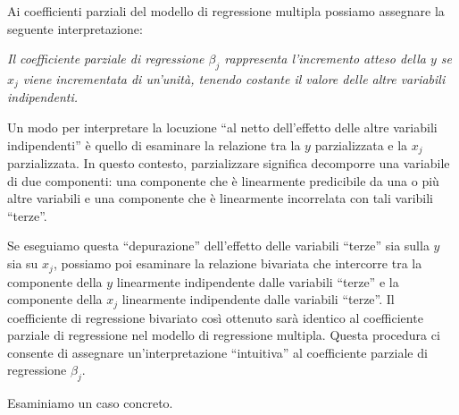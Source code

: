 \documentclass[
  11pt,
]{krantz}
\makeatletter
\newenvironment{Shaded}{\begin{snugshade}}{\end{snugshade}}
\newcommand{\CommentTok}[1]{\textcolor[rgb]{0.37,0.37,0.37}{\textit{#1}}}
\newcommand{\FunctionTok}[1]{\textcolor[rgb]{0,0,0}{#1}}
\newcommand{\NormalTok}[1]{#1}
\newcommand{\OtherTok}[1]{\textcolor[rgb]{0.37,0.37,0.37}{#1}}
\newcommand{\SpecialCharTok}[1]{\textcolor[rgb]{0,0,0}{#1}}
\newcommand{\StringTok}[1]{\textcolor[rgb]{0.5,0.5,0.5}{#1}}
\newenvironment{kframe}{%
\medskip{}
\setlength{\fboxsep}{.8em}
 \def\at@end@of@kframe{}%
 \ifinner\ifhmode%
  \def\at@end@of@kframe{\end{minipage}}%
  \begin{minipage}{\columnwidth}%
 \fi\fi%
 \def\FrameCommand##1{\hskip\@totalleftmargin \hskip-\fboxsep
 \colorbox{shadecolor}{##1}\hskip-\fboxsep
     \hskip-\linewidth \hskip-\@totalleftmargin \hskip\columnwidth}%
 \MakeFramed {\advance\hsize-\width
   \@totalleftmargin\z@ \linewidth\hsize
   \@setminipage}}%
 {\par\unskip\endMakeFramed%
 \at@end@of@kframe}
\renewenvironment{Shaded}{\begin{kframe}}{\end{kframe}}
\theoremstyle{definition}
\theoremstyle{definition}
\theoremstyle{definition}
\theoremstyle{definition}
\theoremstyle{remark}
\makeatother
\begin{document}
Ai coefficienti parziali del modello di regressione multipla possiamo assegnare la seguente interpretazione:

\emph{Il coefficiente parziale di regressione \(\beta_j\) rappresenta l'incremento atteso della \(y\) se \(x_j\) viene incrementata di un'unità, tenendo costante il valore delle altre variabili indipendenti.}

Un modo per interpretare la locuzione ``al netto dell'effetto delle altre variabili indipendenti'' è quello di esaminare la relazione tra la \(y\) parzializzata e la \(x_j\) parzializzata. In questo contesto, parzializzare significa decomporre una variabile di due componenti: una componente che è linearmente predicibile da una o più altre variabili e una componente che è linearmente incorrelata con tali varibili ``terze''.

Se eseguiamo questa ``depurazione'' dell'effetto delle variabili ``terze'' sia sulla \(y\) sia su \(x_j\), possiamo poi esaminare la relazione bivariata che intercorre tra la componente della \(y\) linearmente indipendente dalle variabili ``terze'' e la componente della \(x_j\) linearmente indipendente dalle variabili ``terze''. Il coefficiente di regressione bivariato così ottenuto sarà identico al coefficiente parziale di regressione nel modello di regressione multipla. Questa procedura ci consente di assegnare un'interpretazione ``intuitiva'' al coefficiente parziale di regressione \(\beta_j\).

Esaminiamo un caso concreto.

\begin{Shaded}
\end{Shaded}
\end{document}
